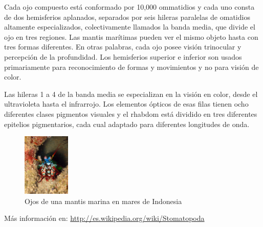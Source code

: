 \documentclass[10pt,twocolumn]{article}
\begin{document}
Cada ojo compuesto está conformado por 10,000 ommatidios y cada uno consta de dos hemisferios aplanados, separados por seis hileras paralelas de omatidios altamente especializados, colectivamente llamados la banda media, que divide el ojo en tres regiones. Las mantis marítimas pueden ver el mismo objeto hasta con tres formas diferentes. En otras palabras, cada ojo posee visión trinocular y percepción de la profundidad. Los hemisferios superior e inferior son usados primariamente para reconocimiento de formas y movimientos y no para visión de color.

Las hileras 1 a 4 de la banda media se especializan en la visión en color, desde el ultravioleta hasta el infrarrojo. Los elementos ópticos de esas filas tienen ocho diferentes clases pigmentos visuales y el rhabdom está dividido en tres diferentes epitelios pigmentarios, cada cual adaptado para diferentes longitudes de onda.

\begin{figure}[h] 
	\centering
	\includegraphics[width=0.2\textwidth]{img/indonesian_mantis_shrimp.jpg}
	\caption{Ojos de una mantis marina en mares de Indonesia}
	\label{fig:tres}
\end{figure}





Más información en:  \url{http://es.wikipedia.org/wiki/Stomatopoda}
\end{document}
